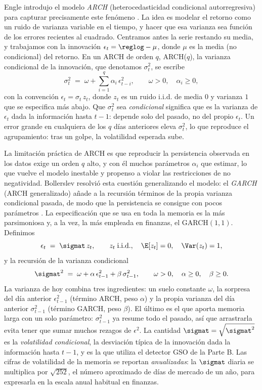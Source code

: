Engle introdujo el modelo \emph{ARCH} (heterocedasticidad condicional autorregresiva) para capturar precisamente este fenómeno \cite{engle1982}. La idea es modelar el retorno como un ruido de varianza variable en el tiempo, y hacer que esa varianza sea función de los errores recientes al cuadrado. Centramos antes la serie restando su media, y trabajamos con la innovación $\epsilon_t = \reglog - \mu$, donde $\mu$ es la media (no condicional) del retorno. En un ARCH de orden $q$, ARCH($q$), la varianza condicional de la innovación, que denotamos $\sigma_t^2$, se escribe
\[
\sigma_t^2 \;=\; \omega + \sum_{i=1}^{q} \alpha_i\, \epsilon_{t-i}^2,
\qquad \omega > 0, \quad \alpha_i \ge 0,
\]
con la convención $\epsilon_t = \sigma_t\, z_t$, donde $z_t$ es un ruido i.i.d. de media $0$ y varianza $1$ que se especifica más abajo. Que $\sigma_t^2$ sea \emph{condicional} significa que es la varianza de $\epsilon_t$ dada la información hasta $t-1$: depende solo del pasado, no del propio $\epsilon_t$. Un error grande en cualquiera de los $q$ días anteriores eleva $\sigma_t^2$, lo que reproduce el agrupamiento: tras un golpe, la volatilidad esperada sube.

La limitación práctica de ARCH es que reproducir la persistencia observada en los datos exige un orden $q$ alto, y con él muchos parámetros $\alpha_i$ que estimar, lo que vuelve el modelo inestable y propenso a violar las restricciones de no negatividad. Bollerslev resolvió esta cuestión generalizando el modelo: el \emph{GARCH} (ARCH generalizado) añade a la recursión términos de la propia varianza condicional pasada, de modo que la persistencia se consigue con pocos parámetros \cite{bollerslev1986}. La especificación que se usa en toda la memoria es la más parsimoniosa y, a la vez, la más empleada en finanzas, el GARCH$(1,1)$. Definimos
\[
\epsilon_t \;=\; \sigmat\, z_t, \qquad z_t \;\text{i.i.d.}, \quad \E[z_t] = 0, \quad \Var(z_t) = 1,
\]
y la recursión de la varianza condicional
\begin{equation}
\label{eq:garch11}
\sigmat^2 \;=\; \omega + \alpha\, \epsilon_{t-1}^2 + \beta\, \sigma_{t-1}^2,
\qquad \omega > 0, \quad \alpha \ge 0, \quad \beta \ge 0.
\end{equation}
La varianza de hoy combina tres ingredientes: un suelo constante $\omega$, la sorpresa del día anterior $\epsilon_{t-1}^2$ (término ARCH, peso $\alpha$) y la propia varianza del día anterior $\sigma_{t-1}^2$ (término GARCH, peso $\beta$). El último es el que aporta memoria larga con un solo parámetro: $\sigma_{t-1}^2$ ya resume todo el pasado, así que arrastrarla evita tener que sumar muchos rezagos de $\epsilon^2$. La cantidad $\sigmat = \sqrt{\sigmat^2}$ es la \emph{volatilidad condicional}, la desviación típica de la innovación dada la información hasta $t-1$, y es la que utiliza el detector GSO de la Parte B. Las cifras de volatilidad de la memoria se reportan \emph{anualizadas}: la $\sigmat$ diaria se multiplica por $\sqrt{252}$, el número aproximado de días de mercado de un año, para expresarla en la escala anual habitual en finanzas.

